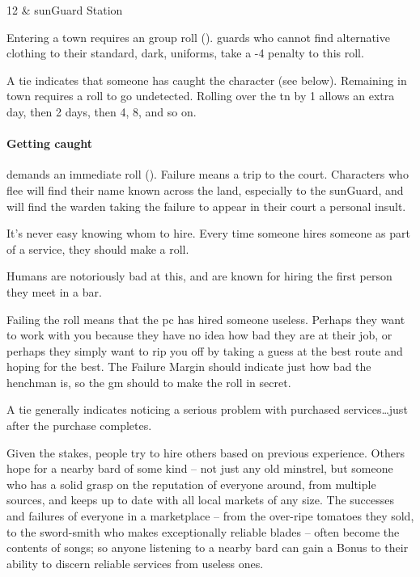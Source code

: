 \begin{multicols}{2}
{\begin{boxtable}
    12 & \gls{sunGuard} Station \\

  \end{boxtable}
}

Entering a town requires an  group roll (\tn[7]).
\Glspl{guard} who cannot find alternative clothing to their standard, dark, uniforms, take a -4 penalty to this roll.

A tie indicates that someone has caught the character (see below).
Remaining in town requires a  roll to go undetected.
Rolling over the \gls{tn} by 1 allows an extra day, then 2 days, then 4, 8, and so on.

\paragraph{Getting caught}
demands an immediate  roll (\tn[10]).
Failure means a trip to the \gls{court}.
Characters who flee will find their name known across the land, especially to the \gls{sunGuard}, and will find the \gls{warden} taking the failure to appear in their \gls{court} a personal insult.

It's never easy knowing whom to hire.
Every time someone hires someone as part of a service, they should make a roll.

Humans are notoriously bad at this, and are known for hiring the first person they meet in a bar.

Failing the roll means that the \gls{pc} has hired someone useless.
Perhaps they want to work with you because they have no idea how bad they are at their job, or perhaps they simply want to rip you off by taking a guess at the best route and hoping for the best.
The Failure Margin should indicate just how bad the henchman is, so the \gls{gm} should to make the roll in secret.

A tie generally indicates noticing a serious problem with purchased services\ldots just after the purchase completes.

Given the stakes, people try to hire others based on previous experience.
Others hope for a nearby bard of some kind -- not just any old minstrel, but someone who has a solid grasp on the reputation of everyone around, from multiple sources, and keeps up to date with all local markets of any size.
The successes and failures of everyone in a marketplace -- from the over-ripe tomatoes they sold, to the sword-smith who makes exceptionally reliable blades -- often become the contents of songs; so anyone listening to a nearby bard can gain a Bonus to their ability to discern reliable services from useless ones.


\end{multicols}
